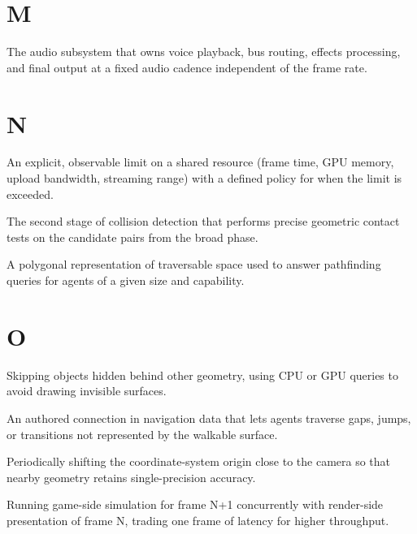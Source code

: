\documentclass[
  11pt,
  letterpaper,
  DIV=11,
  numbers=noendperiod,
  twoside,
  open=right]{scrreprt}
\providecommand{\tightlist}{%
  \setlength{\itemsep}{0pt}\setlength{\parskip}{0pt}}
\begin{document}
\section*{M}\label{m}


\begin{description}
\tightlist
\item[\textbf{Mixer (audio)}]
The audio subsystem that owns voice playback, bus routing, effects
processing, and final output at a fixed audio cadence independent of the
frame rate.
\end{description}

\section*{N}\label{n}


\begin{description}
\tightlist
\item[\textbf{Named budget}]
An explicit, observable limit on a shared resource (frame time, GPU
memory, upload bandwidth, streaming range) with a defined policy for
when the limit is exceeded.
\item[\textbf{Narrow phase}]
The second stage of collision detection that performs precise geometric
contact tests on the candidate pairs from the broad phase.
\item[\textbf{Navigation mesh}]
A polygonal representation of traversable space used to answer
pathfinding queries for agents of a given size and capability.
\end{description}

\section*{O}\label{o}


\begin{description}
\tightlist
\item[\textbf{Occlusion culling}]
Skipping objects hidden behind other geometry, using CPU or GPU queries
to avoid drawing invisible surfaces.
\item[\textbf{Off-mesh link}]
An authored connection in navigation data that lets agents traverse
gaps, jumps, or transitions not represented by the walkable surface.
\item[\textbf{Origin rebasing}]
Periodically shifting the coordinate-system origin close to the camera
so that nearby geometry retains single-precision accuracy.
\item[\textbf{Overlapped execution}]
Running game-side simulation for frame N+1 concurrently with render-side
presentation of frame N, trading one frame of latency for higher
throughput.
\end{description}
\end{document}
